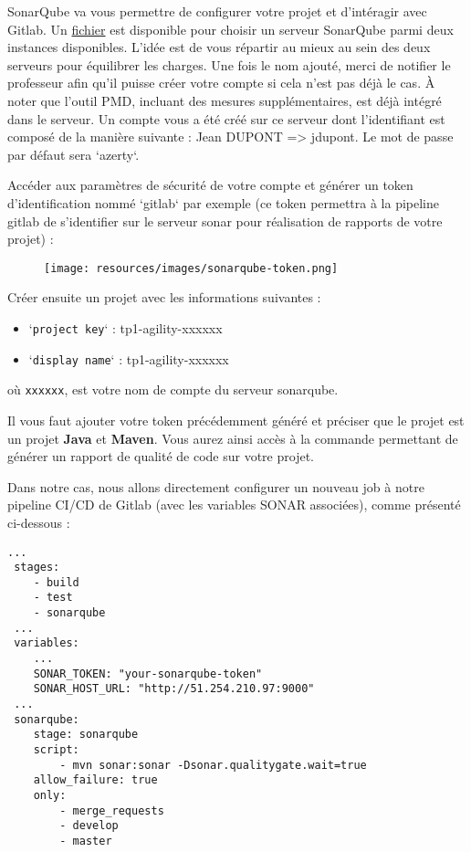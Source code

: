 \documentclass[11pt,a4paper,oneside]{article}
\begin{document}
SonarQube va vous permettre de configurer votre projet et d'intéragir avec Gitlab. Un \href{https://docs.google.com/spreadsheets/d/1n4Ui0-kKvXZbSVeffCLunpR92ZkUwUOFmNYWVU5p8TI/edit?usp=sharing}{fichier} est disponible pour choisir un serveur SonarQube parmi deux instances disponibles. L'idée est de vous répartir au mieux au sein des deux serveurs pour équilibrer les charges. Une fois le nom ajouté, merci de notifier le professeur afin qu'il puisse créer votre compte si cela n'est pas déjà le cas. À noter que l'outil PMD, incluant des mesures supplémentaires, est déjà intégré dans le serveur. Un compte vous a été créé sur ce serveur dont l'identifiant est composé de la manière suivante : Jean DUPONT => jdupont. Le mot de passe par défaut sera `azerty`.

\vspace{5mm}
Accéder aux paramètres de sécurité de votre compte et générer un token d'identification nommé `gitlab` par exemple (ce token permettra à la pipeline gitlab de s'identifier sur le serveur sonar pour réalisation de rapports de votre projet) :

\begin{figure}[h]
	\centering
	\texttt{[image: resources/images/sonarqube-token.png]}
\end{figure}



\vspace{15mm}
Créer ensuite un projet avec les informations suivantes :
\begin{itemize}
	\item `\texttt{project key}` : tp1-agility-xxxxxx
	\item `\texttt{display name}` : tp1-agility-xxxxxx
\end{itemize}

où \texttt{xxxxxx}, est votre nom de compte du serveur sonarqube.

\vspace{5mm}
Il vous faut ajouter votre token précédemment généré et préciser que le projet est un projet \textbf{Java} et \textbf{Maven}. Vous aurez ainsi accès à la commande permettant de générer un rapport de qualité de code sur votre projet. 

\vspace{5mm}
Dans notre cas, nous allons directement configurer un nouveau job à notre pipeline CI/CD de Gitlab (avec les variables SONAR associées), comme présenté ci-dessous :

\begin{lstlisting}[style=custombash]
 ...
 stages:
	- build
	- test
	- sonarqube
 ...
 variables:
 	...
	SONAR_TOKEN: "your-sonarqube-token"
	SONAR_HOST_URL: "http://51.254.210.97:9000"
 ...
 sonarqube:
	stage: sonarqube
	script:
		- mvn sonar:sonar -Dsonar.qualitygate.wait=true
	allow_failure: true
	only:
		- merge_requests
		- develop
		- master
\end{lstlisting}
\end{document}

